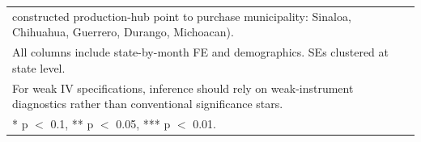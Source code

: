 \begin{table}[H]
\begin{tabular}[t]{lcccc}
\multicolumn{5}{l}{\rule{0pt}{1em}constructed production-hub point to purchase municipality: Sinaloa, Chihuahua, Guerrero, Durango, Michoacan).}\\
\multicolumn{5}{l}{\rule{0pt}{1em}All columns include state-by-month FE and demographics. SEs clustered at state level.}\\
\multicolumn{5}{l}{\rule{0pt}{1em}For weak IV specifications, inference should rely on weak-instrument diagnostics rather than conventional significance stars.}\\
\multicolumn{5}{l}{\rule{0pt}{1em}* p $<$ 0.1, ** p $<$ 0.05, *** p $<$ 0.01.}\\
\end{tabular}
\end{table}
